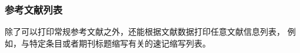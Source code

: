 %
%
%
%
%
%
%




\subsubsection{参考文献列表} %
\label{use:bib:biblist}


\biblatex 除了可以打印常规参考文献之外，还能根据文献数据打印任意文献信息列表，
例如，与特定条目或者期刊标题缩写有关的速记缩写列表。


